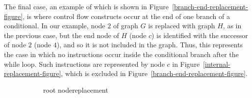 The final case, an example of which is shown in
Figure~\ref{branch-end-replacement-figure}, is where control flow
constructs occur at the end of one branch of a conditional.
In our example, node $2$ of graph $G$ is replaced with graph $H$, as
in the previous case, but the end node of $H$ (node $c$) is identified
with the successor of node $2$ (node $4$), and so it is not included
in the graph.
Thus, this represents the case in which no instructions occur inside
the conditional branch after the while loop.
Such instructions are represented by node $c$ in
Figure~\ref{internal-replacement-figure}, which is excluded in
Figure~\ref{branch-end-replacement-figure}.

\begin{figure}
  \begin{subfigure}{0.24\textwidth}
    \begin{center}
    \caption{\centering root node\newline replacement}
    \label{root-replacement-figure}
  \end{center}
  \end{subfigure}
  \begin{subfigure}{0.24\textwidth}
    \begin{center}
\end{center}
\end{subfigure}
\end{figure}
